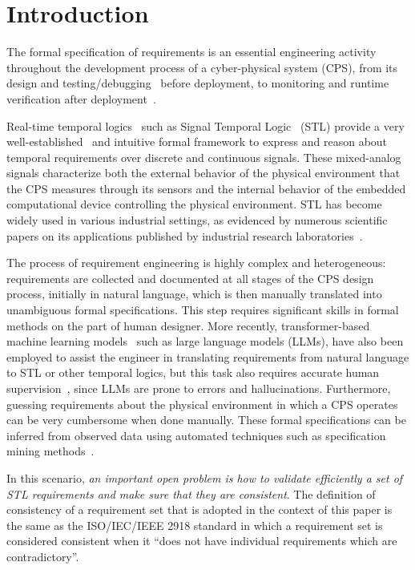 \documentclass[acmsmall,screen]{acmart}
\begin{document}
\section{Introduction}
\label{sec:intro}


The formal specification of requirements is an essential engineering activity~\cite{BoufaiedJBBP21} throughout the development process of a cyber-physical system (CPS), from its design and testing/debugging~\cite{BoufaiedMBB23,cps2025,BartocciMMMN21} before deployment, to monitoring and runtime verification after deployment~\cite{JaksicBGKNN15}. 

Real-time temporal logics~\cite{Koymans90} such as Signal Temporal Logic~\cite{MalerN04} (STL) provide a very well-established~\cite{BartocciDDFMNS18} and intuitive formal framework to express and reason about temporal requirements over discrete and continuous signals.  These mixed-analog signals characterize both the external behavior of the physical environment that the CPS measures through its sensors and the internal behavior of the embedded computational device controlling the physical environment.  STL has become widely used in various industrial settings, as evidenced by numerous scientific papers on its applications published by industrial research laboratories~\cite{MolinANZBE23,Kapinski2016STLibAL,RoehmHM17}. 

The process of requirement engineering is highly complex and heterogeneous: requirements are collected and documented at all stages of the CPS design process, initially in natural language, which is then manually translated into unambiguous formal specifications. This step requires significant skills in formal methods on the part of human designer.
More recently, transformer-based machine learning models~\cite{HeBNIG22} such as large language models (LLMs), have also been employed to assist the engineer in translating requirements from natural language to STL or other temporal logics, but this task also requires accurate human supervision~\cite{MohammadinejadPXKTD24}, since LLMs are prone to errors and hallucinations. Furthermore, guessing requirements about the physical environment in which a CPS operates
can be very cumbersome when done manually. These formal specifications can be inferred from observed data using automated techniques such as specification mining methods~\cite{BartocciMNN22}. 

In this scenario, \emph{an important open problem is how to validate efficiently a set of STL requirements and make sure that they are consistent}.
The definition of consistency of a requirement set that is adopted in the context of this paper is the same as the ISO/IEC/IEEE 2918 standard \cite{ISO29148} in which a requirement set is considered consistent when it ``does not have individual requirements which are contradictory''.
\end{document}
